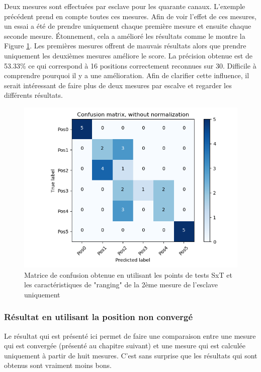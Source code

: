 Deux mesures sont effectuées par esclave pour les quarante canaux. L'exemple précédent prend en compte toutes ces mesures. Afin de voir l'effet de ces mesures, un essai a été de prendre uniquement chaque première mesure et ensuite chaque seconde mesure. Étonnement, cela a amélioré les résultats comme le montre la Figure \ref{fig:matPosSxTRaw1}. Les premières mesures offrent de mauvais résultats alors que prendre uniquement les deuxièmes mesures améliore le score. La précision obtenue est de 53.33\% ce qui correspond à 16 positions correctement reconnues sur 30. Difficile à comprendre pourquoi il y a une amélioration. Afin de clarifier cette influence, il serait intéressant de faire plus de deux mesures par escalve et regarder les différents résultats.
\begin{figure}[htp]
 \begin{center}
  \includegraphics[scale=0.5]{figures/mat_pos_SxT_raw1.png}
  \caption{Matrice de confusion obtenue en utilisant les points de tests SxT et les caractéristiques de "ranging" de la 2ème mesure de l'esclave uniquement}
  \label{fig:matPosSxTRaw1} %
 \end{center}
\end{figure}

\subsubsection{Résultat en utilisant la position non convergé}
Le résultat qui est présenté ici permet de faire une comparaison entre une mesure qui est convergée (présenté au chapitre suivant) et une mesure qui est calculée uniquement à partir de huit mesures. C'est sans surprise que les résultats qui sont obtenus sont vraiment moins bons.

